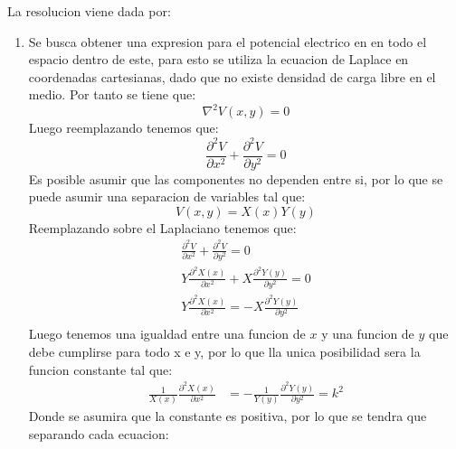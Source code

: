 \documentclass[
  11pt,
  letterpaper,
   addpoints,
   answers
  ]{exam}
\begin{document}
\begin{questions}
\begin{center}
\end{center}
    \begin{solution}
        La resolucion viene dada por:
        \begin{enumerate}
            \item Se busca obtener una expresion para el potencial electrico en en todo el espacio dentro de este, para esto se utiliza la ecuacion de Laplace en coordenadas cartesianas, dado que no existe densidad de carga libre en el medio. Por tanto se tiene que:
            \begin{equation}
                \nabla^{2} V(x,y) = 0
            \end{equation}
            Luego reemplazando tenemos que:
            \begin{equation}
                \frac{\partial^{2}V}{\partial x^{2}} + \frac{\partial^{2}V}{\partial y^{2}} = 0
            \end{equation}
            Es posible asumir que las componentes no dependen entre si, por lo que se puede asumir una separacion de variables tal que:
            \begin{equation}
                V(x,y) = X(x)Y(y)
            \end{equation}
            Reemplazando sobre el Laplaciano tenemos que:
            \begin{align}
                \frac{\partial^{2}V}{\partial x^{2}} + \frac{\partial^{2}V}{\partial y^{2}} = 0\\
                Y\frac{\partial^{2}X(x)}{\partial x^{2}} + X\frac{\partial^{2}Y(y)}{\partial y^{2}} = 0\\
                Y\frac{\partial^{2}X(x)}{\partial x^{2}}= - X\frac{\partial^{2}Y(y)}{\partial y^{2}}\\
            \end{align}
            Luego tenemos una igualdad entre una funcion de $x$ y una funcion de $y$ que debe cumplirse para todo x e y, por lo que lla unica posibilidad sera la funcion constante tal que:
            \begin{align}
                \frac{1}{X(x)}\frac{\partial^{2}X(x)}{\partial x^{2}} &= -\frac{1}{Y(y)}\frac{\partial^{2}Y(y)}{\partial y^{2}} = k^{2}
            \end{align}
            Donde se asumira que la constante es positiva, por lo que se tendra que separando cada ecuacion:

\end{enumerate}
\end{solution}
\end{questions}
\end{document}
